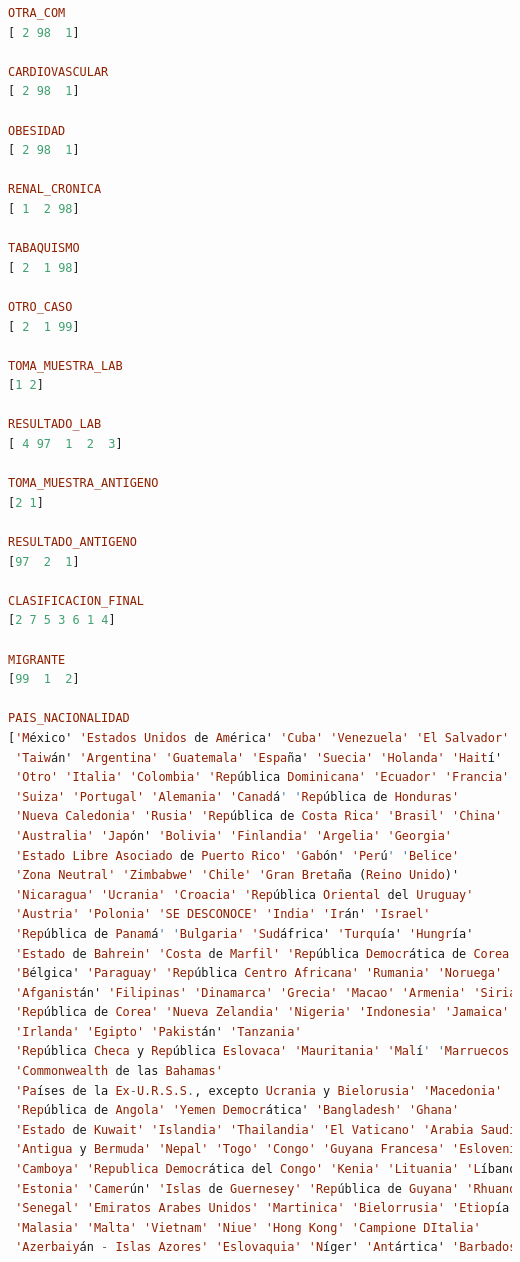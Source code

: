 \begin{lstlisting}[language=haskell, caption=Valores por columna, captionpos=b, label=lst:fiboHaskell]
OTRA_COM
[ 2 98  1]

CARDIOVASCULAR
[ 2 98  1]

OBESIDAD
[ 2 98  1]

RENAL_CRONICA
[ 1  2 98]

TABAQUISMO
[ 2  1 98]

OTRO_CASO
[ 2  1 99]

TOMA_MUESTRA_LAB
[1 2]

RESULTADO_LAB
[ 4 97  1  2  3]

TOMA_MUESTRA_ANTIGENO
[2 1]

RESULTADO_ANTIGENO
[97  2  1]

CLASIFICACION_FINAL
[2 7 5 3 6 1 4]

MIGRANTE
[99  1  2]

PAIS_NACIONALIDAD
['México' 'Estados Unidos de América' 'Cuba' 'Venezuela' 'El Salvador'
 'Taiwán' 'Argentina' 'Guatemala' 'España' 'Suecia' 'Holanda' 'Haití'
 'Otro' 'Italia' 'Colombia' 'República Dominicana' 'Ecuador' 'Francia'
 'Suiza' 'Portugal' 'Alemania' 'Canadá' 'República de Honduras'
 'Nueva Caledonia' 'Rusia' 'República de Costa Rica' 'Brasil' 'China'
 'Australia' 'Japón' 'Bolivia' 'Finlandia' 'Argelia' 'Georgia'
 'Estado Libre Asociado de Puerto Rico' 'Gabón' 'Perú' 'Belice'
 'Zona Neutral' 'Zimbabwe' 'Chile' 'Gran Bretaña (Reino Unido)'
 'Nicaragua' 'Ucrania' 'Croacia' 'República Oriental del Uruguay'
 'Austria' 'Polonia' 'SE DESCONOCE' 'India' 'Irán' 'Israel'
 'República de Panamá' 'Bulgaria' 'Sudáfrica' 'Turquía' 'Hungría'
 'Estado de Bahrein' 'Costa de Marfil' 'República Democrática de Corea'
 'Bélgica' 'Paraguay' 'República Centro Africana' 'Rumania' 'Noruega'
 'Afganistán' 'Filipinas' 'Dinamarca' 'Grecia' 'Macao' 'Armenia' 'Siria'
 'República de Corea' 'Nueva Zelandia' 'Nigeria' 'Indonesia' 'Jamaica'
 'Irlanda' 'Egipto' 'Pakistán' 'Tanzania'
 'República Checa y República Eslovaca' 'Mauritania' 'Malí' 'Marruecos'
 'Commonwealth de las Bahamas'
 'Países de la Ex-U.R.S.S., excepto Ucrania y Bielorusia' 'Macedonia'
 'República de Angola' 'Yemen Democrática' 'Bangladesh' 'Ghana'
 'Estado de Kuwait' 'Islandia' 'Thailandia' 'El Vaticano' 'Arabia Saudita'
 'Antigua y Bermuda' 'Nepal' 'Togo' 'Congo' 'Guyana Francesa' 'Eslovenia'
 'Camboya' 'Republica Democrática del Congo' 'Kenia' 'Lituania' 'Líbano'
 'Estonia' 'Camerún' 'Islas de Guernesey' 'República de Guyana' 'Rhuanda'
 'Senegal' 'Emiratos Arabes Unidos' 'Martinica' 'Bielorrusia' 'Etiopía'
 'Malasia' 'Malta' 'Vietnam' 'Niue' 'Hong Kong' 'Campione DItalia'
 'Azerbaiyán - Islas Azores' 'Eslovaquia' 'Níger' 'Antártica' 'Barbados'

\end{lstlisting}
